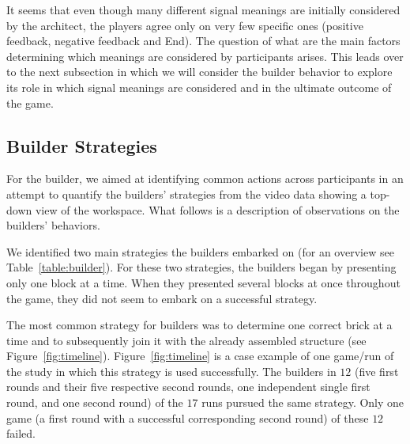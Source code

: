 It seems that even though many different signal meanings are initially considered by the architect, the players agree only on very few specific ones (positive feedback, negative feedback and End). The question of what are the main factors determining which meanings are considered by participants arises.
This leads over to the next subsection in which we will consider the builder behavior to explore its role in which signal meanings are considered and in the ultimate outcome of the game.

\subsection{Builder Strategies}
\label{sec:builder}
For the builder, we aimed at identifying common actions across participants in an attempt to quantify the builders' strategies from the video data showing a top-down view of the workspace.
What follows is a description of observations on the builders' behaviors.

We identified two main strategies the builders embarked on (for an overview see Table~\ref{table:builder}). For these two strategies, the builders began by presenting only one block at a time. When they presented several blocks at once throughout the game, they did not seem to embark on a successful strategy. 

The most common strategy for builders was to determine one correct brick at a time and to subsequently join it with the already assembled structure (see Figure~\ref{fig:timeline}). Figure~\ref{fig:timeline} is a case example of one game/run of the study in which this strategy is used successfully.
The builders in $12$ (five first rounds and their five respective second rounds, one independent single first round, and one second round) of the $17$ runs pursued the same strategy. Only one game (a first round with a successful corresponding second round) of these $12$ failed. 


